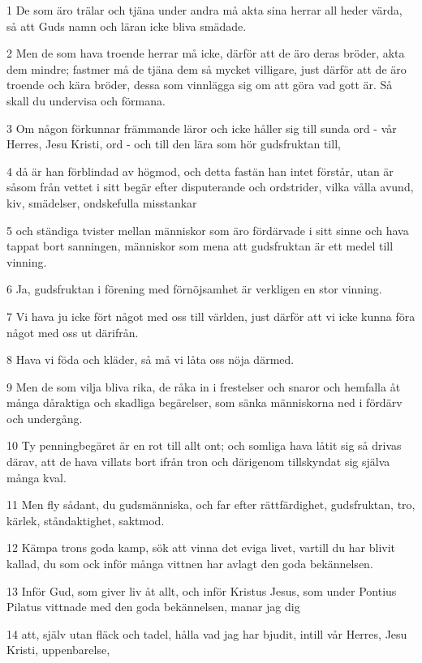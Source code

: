 \par 1 De som äro trälar och tjäna under andra må akta sina herrar all heder värda, så att Guds namn och läran icke bliva smädade.
\par 2 Men de som hava troende herrar må icke, därför att de äro deras bröder, akta dem mindre; fastmer må de tjäna dem så mycket villigare, just därför att de äro troende och kära bröder, dessa som vinnlägga sig om att göra vad gott är. Så skall du undervisa och förmana.
\par 3 Om någon förkunnar främmande läror och icke håller sig till sunda ord - vår Herres, Jesu Kristi, ord - och till den lära som hör gudsfruktan till,
\par 4 då är han förblindad av högmod, och detta fastän han intet förstår, utan är såsom från vettet i sitt begär efter disputerande och ordstrider, vilka vålla avund, kiv, smädelser, ondskefulla misstankar
\par 5 och ständiga tvister mellan människor som äro fördärvade i sitt sinne och hava tappat bort sanningen, människor som mena att gudsfruktan är ett medel till vinning.
\par 6 Ja, gudsfruktan i förening med förnöjsamhet är verkligen en stor vinning.
\par 7 Vi hava ju icke fört något med oss till världen, just därför att vi icke kunna föra något med oss ut därifrån.
\par 8 Hava vi föda och kläder, så må vi låta oss nöja därmed.
\par 9 Men de som vilja bliva rika, de råka in i frestelser och snaror och hemfalla åt många dåraktiga och skadliga begärelser, som sänka människorna ned i fördärv och undergång.
\par 10 Ty penningbegäret är en rot till allt ont; och somliga hava låtit sig så drivas därav, att de hava villats bort ifrån tron och därigenom tillskyndat sig själva många kval.
\par 11 Men fly sådant, du gudsmänniska, och far efter rättfärdighet, gudsfruktan, tro, kärlek, ståndaktighet, saktmod.
\par 12 Kämpa trons goda kamp, sök att vinna det eviga livet, vartill du har blivit kallad, du som ock inför många vittnen har avlagt den goda bekännelsen.
\par 13 Inför Gud, som giver liv åt allt, och inför Kristus Jesus, som under Pontius Pilatus vittnade med den goda bekännelsen, manar jag dig
\par 14 att, själv utan fläck och tadel, hålla vad jag har bjudit, intill vår Herres, Jesu Kristi, uppenbarelse,
